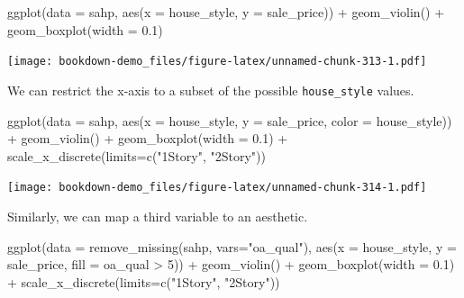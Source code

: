 \documentclass[
]{book}
\newenvironment{Shaded}{\begin{snugshade}}{\end{snugshade}}
\newcommand{\AttributeTok}[1]{\textcolor[rgb]{0.77,0.63,0.00}{#1}}
\newcommand{\DecValTok}[1]{\textcolor[rgb]{0.00,0.00,0.81}{#1}}
\newcommand{\FloatTok}[1]{\textcolor[rgb]{0.00,0.00,0.81}{#1}}
\newcommand{\FunctionTok}[1]{\textcolor[rgb]{0.00,0.00,0.00}{#1}}
\newcommand{\NormalTok}[1]{#1}
\newcommand{\SpecialCharTok}[1]{\textcolor[rgb]{0.00,0.00,0.00}{#1}}
\newcommand{\StringTok}[1]{\textcolor[rgb]{0.31,0.60,0.02}{#1}}
\begin{document}
\begin{Shaded}
\begin{Highlighting}[]
\FunctionTok{ggplot}\NormalTok{(}\AttributeTok{data =}\NormalTok{ sahp, }\FunctionTok{aes}\NormalTok{(}\AttributeTok{x =}\NormalTok{ house\_style, }\AttributeTok{y =}\NormalTok{ sale\_price)) }\SpecialCharTok{+} 
  \FunctionTok{geom\_violin}\NormalTok{() }\SpecialCharTok{+}
  \FunctionTok{geom\_boxplot}\NormalTok{(}\AttributeTok{width =} \FloatTok{0.1}\NormalTok{)}
\end{Highlighting}
\end{Shaded}

\texttt{[image: bookdown-demo\_files/figure-latex/unnamed-chunk-313-1.pdf]}

We can restrict the x-axis to a subset of the possible \texttt{house\_style} values.

\begin{Shaded}
\begin{Highlighting}[]
\FunctionTok{ggplot}\NormalTok{(}\AttributeTok{data =}\NormalTok{ sahp, }\FunctionTok{aes}\NormalTok{(}\AttributeTok{x =}\NormalTok{ house\_style, }\AttributeTok{y =}\NormalTok{ sale\_price, }\AttributeTok{color =}\NormalTok{ house\_style)) }\SpecialCharTok{+} 
  \FunctionTok{geom\_violin}\NormalTok{() }\SpecialCharTok{+}
  \FunctionTok{geom\_boxplot}\NormalTok{(}\AttributeTok{width =} \FloatTok{0.1}\NormalTok{) }\SpecialCharTok{+} 
  \FunctionTok{scale\_x\_discrete}\NormalTok{(}\AttributeTok{limits=}\FunctionTok{c}\NormalTok{(}\StringTok{"1Story"}\NormalTok{, }\StringTok{"2Story"}\NormalTok{))}
\end{Highlighting}
\end{Shaded}

\texttt{[image: bookdown-demo\_files/figure-latex/unnamed-chunk-314-1.pdf]}

Similarly, we can map a third variable to an aesthetic.

\begin{Shaded}
\begin{Highlighting}[]
\FunctionTok{ggplot}\NormalTok{(}\AttributeTok{data =} \FunctionTok{remove\_missing}\NormalTok{(sahp, }\AttributeTok{vars=}\StringTok{"oa\_qual"}\NormalTok{), }\FunctionTok{aes}\NormalTok{(}\AttributeTok{x =}\NormalTok{ house\_style, }\AttributeTok{y =}\NormalTok{ sale\_price, }\AttributeTok{fill =}\NormalTok{ oa\_qual }\SpecialCharTok{\textgreater{}} \DecValTok{5}\NormalTok{)) }\SpecialCharTok{+} 
  \FunctionTok{geom\_violin}\NormalTok{() }\SpecialCharTok{+}
  \FunctionTok{geom\_boxplot}\NormalTok{(}\AttributeTok{width =} \FloatTok{0.1}\NormalTok{) }\SpecialCharTok{+} 
  \FunctionTok{scale\_x\_discrete}\NormalTok{(}\AttributeTok{limits=}\FunctionTok{c}\NormalTok{(}\StringTok{"1Story"}\NormalTok{, }\StringTok{"2Story"}\NormalTok{))}
\end{Highlighting}
\end{Shaded}
\end{document}
